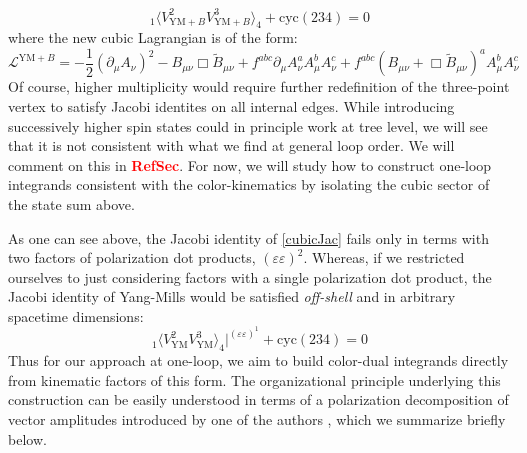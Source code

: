 \documentclass[11pt,letter]{article}
\def\be{\begin{equation}}
\def\ee{\end{equation}}
\newcommand{\sect}{\textbf{\textcolor{red}{RefSec}}}
\begin{document}
\be
{}_1\langle V^{2}_{\text{YM}+B}V^{3}_{\text{YM}+B}\rangle_4+\text{cyc}(234) =0
\ee
where the new cubic Lagrangian is of the form:
\be
\mathcal{L}^{\text{YM}+B} = -\frac{1}{2}(\partial_\mu A_\nu)^2 - B_{\mu\nu}\Box\tilde{B}_{\mu\nu}+ f^{abc} \partial_\mu A^a_\nu A^b_\mu A^c_\nu+ f^{abc} (B_{\mu\nu}+\Box \tilde{B}_{\mu\nu})^a A^b_\mu A^c_\nu
\ee
Of course, higher multiplicity would require further redefinition of the three-point vertex to satisfy Jacobi identites on all internal edges. While introducing successively higher spin states could in principle work at tree level, we will see that it is not consistent with what we find at general loop order. We will comment on this in \sect{}. For now, we will study how to construct one-loop integrands consistent with the color-kinematics by isolating the cubic sector of the state sum above. 

As one can see above, the Jacobi identity of \ref{cubicJac} fails only in terms with two factors of polarization dot products, $(\varepsilon\varepsilon)^2$. Whereas, if we restricted ourselves to just considering factors with a single polarization dot product, the Jacobi identity of Yang-Mills would be satisfied \textit{off-shell} and in arbitrary spacetime dimensions:
\be
{}_1\langle V^{2}_{\text{YM}}V^{3}_{\text{YM}}\rangle_4\big|^{(\varepsilon\varepsilon)^1}+\text{cyc}(234) =0
\ee
Thus for our approach at one-loop, we aim to build color-dual integrands directly from kinematic factors of this form. The organizational principle underlying this construction can be easily understood in terms of a polarization decomposition of vector amplitudes introduced by one of the authors \cite{Pavao:2022kog}, which we summarize briefly below. 
\end{document}

